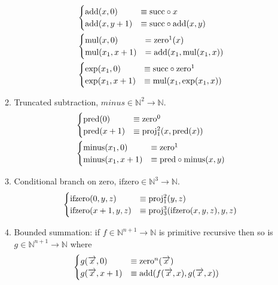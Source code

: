 \documentclass[10pt,\jkfside,a4paper]{article}
\begin{document}
\begin{enumerate}
\begin{enumerate}
\begin{align*}
&\begin{cases}
\text{add}(x, 0) &\equiv \text{succ} \circ x \\
\text{add}(x, y+1) &\equiv \text{succ} \circ \text{add}(x, y)
\end{cases}\\
&\begin{cases}
\text{mul}(x, 0) &= \text{zero}^{1}(x) \\
\text{mul}(x_1, x + 1) &= \text{add}(x_1, \text{mul}(x_1, x))
\end{cases}\\
&\begin{cases}
\exp(x_1, 0) &\equiv \text{succ} \circ \text{zero}^{1} \\
\exp(x_1, x + 1) &\equiv \text{mul}(x_1, \exp(x_1, x))
\end{cases}
\end{align*}

\newcommand{\pred}{\text{pred}}
\newcommand{\minus}{\text{minus}}
\item Truncated subtraction, $ minus \in \mathbb{N}^2 \to \mathbb{N} $.
\begin{align*}
&\begin{cases}
\pred(0) &\equiv \zero{0} \\
\pred(x+1) &\equiv \proj{2}{1}(x, \pred(x))
\end{cases}\\
&\begin{cases}
\minus(x_1, 0) &\equiv \zero{1} \\
\minus(x_1, x+1) &\equiv \pred \circ \minus(x, y)
\end{cases}
\end{align*}

\newcommand{\iz}{\text{ifzero}}

\item Conditional branch on zero, $\iz \in \mathbb{N}^3 \to \mathbb{N}$.
\[
\begin{cases}
\iz(0, y, z)		&\equiv \proj{2}{1}(y, z) \\
\iz(x + 1, y, z)	&\equiv \proj{3}{3}(\iz(x, y, z), y, z)
\end{cases}
\]

\newcommand{\rx}{\ensuremath{\overrightarrow{x}}}
\item Bounded summation: if $f \in \mathbb{N}^{n+1} \to \mathbb{N}$ is
primitive recursive then so is $g \in \mathbb{N}^{n+1} \to \mathbb{N}$ where
\begin{align*}
&\begin{cases}
g(\rx, 0) &\equiv \zero{n}(\rx) \\
g(\rx, x + 1) &\equiv \add(f(\rx, x), g(\rx, x))
\end{cases}
\end{align*}


\end{enumerate}
\end{enumerate}
\end{document}
